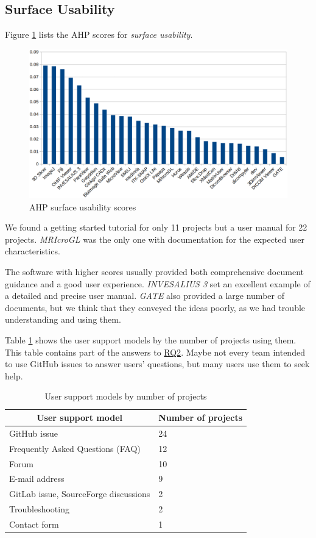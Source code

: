 \documentclass[preprint,12pt,authoryear]{elsarticle}
\begin{document}
\subsection{Surface Usability} \label{sec_result_usability}

Figure \ref{fg_usability_scores} lists the AHP scores for \textit{surface
usability}.

\begin{figure}[ht]
\includegraphics[scale=0.38]{figures/usability_scores.png}
\caption{AHP surface usability scores}
\label{fg_usability_scores}
\end{figure}

We found a getting started tutorial for only 11 projects but a user manual for
22 projects. \textit{MRIcroGL} was the only one with documentation for the
expected user characteristics.

The software with higher scores usually provided both comprehensive document
guidance and a good user experience. \textit{INVESALIUS 3} set an excellent
example of a detailed and precise user manual. \textit{GATE} also provided a
large number of documents, but we think that they conveyed the ideas poorly, as
we had trouble understanding and using them.
 
Table \ref{tab_user_support_model} shows the user support models by the number
of projects using them. This table contains part of the answers to
\hyperlink{rq2}{RQ2}. Maybe not every team intended to use GitHub issues to
answer users' questions, but many users use them to seek help.

\begin{table}[ht]
\centering
\begin{tabular}{ll}
\hline
\multicolumn{1}{c}{User support model} & Number of projects \\ \hline
GitHub issue & 24 \\
Frequently Asked Questions (FAQ) & 12 \\
Forum & 10 \\
E-mail address & 9 \\
GitLab issue, SourceForge discussions & 2 \\
Troubleshooting & 2 \\
Contact form & 1 \\ \hline
\end{tabular}
\caption{\label{tab_user_support_model}User support models by number of projects}
\end{table}
\end{document}
